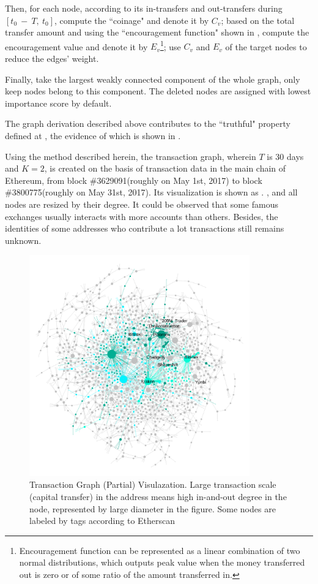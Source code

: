 Then, for each node, according to its in-transfers and out-transfers during $[t_0\ −\ T,\ t_0]$, compute the ``coinage" and denote it by $C_v$; based on the total transfer amount and using the ``encouragement function" shown in , compute the encouragement value and denote it by $E_v$\footnote{Encouragement function can be represented as a linear combination of two normal distributions, which outputs peak value when the money transferred out is zero or of some ratio of the amount transferred in.}; use $C_v$ and $E_v$ of the target nodes to reduce the edges' weight.

Finally, take the largest weakly connected component of the whole graph, only keep nodes belong to this component. The deleted nodes are assigned with lowest importance score by default.

The graph derivation described above contributes to the ``truthful" property defined at , the evidence of which is shown in .

Using the method described herein, the transaction graph, wherein $T$ is 30 days and $K=2$, is created on the basis of transaction data in the main chain of Ethereum, from block \#3629091(roughly on May 1st, 2017) to block \#3800775(roughly on May 31st, 2017). Its visualization is shown as . , and all nodes are resized by their degree. It could be observed that some famous exchanges usually interacts with more accounts than others. Besides, the identities of some addresses who contribute a lot transactions still remains unknown. 

\begin{figure}[htbp]
	\centering
	\includegraphics[width=0.85\textwidth]{figs/wgc1.png}
	\caption{Transaction Graph (Partial) Visulazation. \small{Large transaction scale (capital transfer) in the address means high in-and-out degree in the node, represented by large diameter in the figure. Some nodes are labeled by tags according to Etherscan\cite{etherscan}}  }\label{fig:wgc}
\end{figure}


